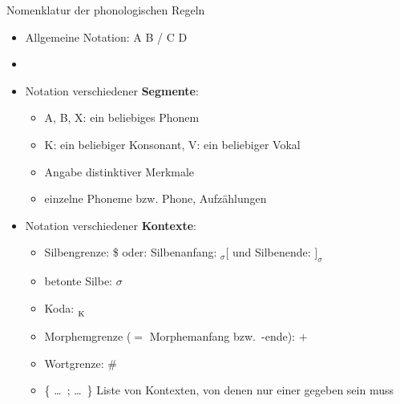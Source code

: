 \begin{frame}{Nomenklatur der phonologischen Regeln}

\settowidth{}

\begin{itemize}
	\item Allgemeine Notation: A \ras B / C \underline{\quad} D
	\item[]  
\end{itemize}


\begin{minipage}{.8\textwidth}
\begin{itemize}
	\item Notation verschiedener \textbf{Segmente}:
	\begin{itemize}
		\item A, B, X: ein beliebiges Phonem
		\item K: ein beliebiger Konsonant, V: ein beliebiger Vokal
		\item Angabe distinktiver Merkmale
		\item einzelne Phoneme bzw. Phone, Aufzählungen
	\end{itemize}
\end{itemize}
\end{minipage}
\begin{minipage}[c][][c]{.19\textwidth}


\end{minipage}

\begin{itemize}
	\item Notation verschiedener \textbf{Kontexte}:
	\begin{itemize}
		\item Silbengrenze: \$ oder: Silbenanfang: $_\sigma[$ und Silbenende: $]_\sigma$
		\item betonte Silbe: \textprimstress$\sigma$
		\item Koda: \underline{\quad}$_{\textsubscript{K}}$
		\item Morphemgrenze ($=$ Morphemanfang bzw.\ -ende): $+$
		\item Wortgrenze: \#
		\item \{ \dots\ ; \dots\ \} Liste von Kontexten, von denen nur einer gegeben sein muss
	\end{itemize}

\end{itemize}

\end{frame}


